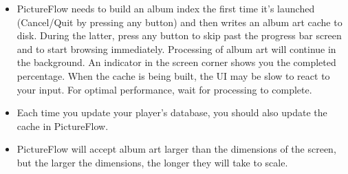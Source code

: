   \begin{itemize}
    \item PictureFlow needs to build an album index the first time it's launched
    (Cancel/Quit by pressing any button) and then writes an album art cache to disk.
    During the latter, press any button to skip past the progress bar screen and
    to start browsing immediately. Processing of album art will continue in the
    background. An indicator in the screen corner shows you the completed percentage.
    When the cache is being built, the UI may be slow to react to your input.
    For optimal performance, wait for processing to complete.
    \item Each time you update your player's database, you should also update the cache
    in PictureFlow.
    \item PictureFlow will accept album art larger than the dimensions of the
    screen, but the larger the dimensions, the longer they will take to scale.
  \end{itemize}


